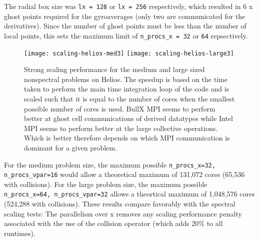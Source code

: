 The radial box size was \texttt{lx = 128} or \texttt{lx = 256} respectively, which resulted in 6 x ghost points required for the gyroaverages (only two are communicated for the derivatives).  Since the number of ghost points must be less than the number of local points, this sets the maximum limit of \texttt{n_procs_x = 32} or \texttt{64} repsectively.

\begin{figure}[htb!]
\begin{center}
\texttt{[image: scaling-helios-med3]}
\texttt{[image: scaling-helios-large3]}
\caption{ Strong scaling performance for the medium and large sized nonspectral problems on Helios. 
          The speedup is based on the time taken to perform the main time integration loop 
          of the code and is scaled such that it is equal to the number of cores when the smallest possible number of cores is used.
          BullX MPI seems to perform better at ghost cell communications of derived datatypes while Intel MPI seems to perform better at the large
collective operations.  Which is better therefore depends on which MPI communication is dominant for a given problem.}  
\label{scalingHelios}
\end{center}
\end{figure}

For the medium problem size, the maximum possible \texttt{n_procs_x=32, n_procs_vpar=16} would allow a theoretical maximum of 131,072 cores (65,536 with collisions).  For the large problem size, the maximum possible \texttt{n_procs_x=64, n_procs_vpar=32} allows a theortical maximum of 1,048,576 cores (524,288 with collisions).  These results compare favorably with the spectral scaling tests: 
The parallelism over x removes any scaling performance penalty associated with the use of the collision operator
(which adds 20\% to all runtimes).  



